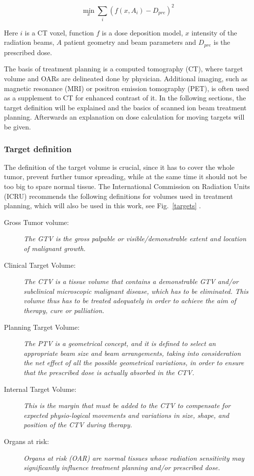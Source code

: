 \documentclass[type=dr, dr=rernat, accentcolor=tud7b,colorbacktitle, bigchapter, openright, twoside, 12pt ]{tudthesis}
\begin{document}
\begin{equation}
  \min_{x} \sum_{i} \left( f(x,A_i) - D_{pre} \right)^2 
\end{equation}

Here $i$ is a CT voxel, function $f$ is a dose deposition model, $x$ intensity of the radiation beams, $A$ patient geometry and beam parameters and $D_{pre}$ is the prescribed dose.

The basis of treatment planning is a computed tomography (CT), where target volume and OARs are delineated
done by physician. Additional imaging, such as magnetic resonance (MRI) or positron emission tomography (PET), is often used as a supplement to CT for enhanced contrast of it. In the following sections, the target definition will be explained and the basics of scanned ion beam treatment planning. Afterwards an explanation on dose calculation for moving targets will be given.

\subsubsection{Target definition}
The definition of the target volume is crucial, since it has to cover the whole tumor, prevent further tumor spreading, while at the same time it should not be too big to spare normal tissue. 
The International Commission on Radiation Units (ICRU) recommends the following definitions for volumes used in treatment planning, which will also be used in this work, see Fig.~\ref{targets} \cite{ICRU50, ICRU62}.
\begin{description}
\item[Gross Tumor volume:] \emph{The GTV is the gross
    palpable or visible/demonstrable extent and location of malignant
    growth.}
\item[Clinical Target Volume:] \emph{The CTV is a tissue
    volume that contains a demonstrable GTV and/or subclinical
    microscopic malignant disease, which has to be eliminated. This
    volume thus has to be treated adequately in order to achieve the
    aim of therapy, cure or palliation.}
\item[Planning Target Volume:] \emph{The PTV is a geometrical
    concept, and it is defined to select an appropriate beam size and
    beam arrangements, taking into consideration the net effect of all
    the possible geometrical variations, in order to ensure that the
    prescribed dose is actually absorbed in the CTV.}
\item[Internal Target Volume:] \emph{This is the margin that must be
    added to the CTV to compensate for expected physio-logical
    movements and variations in size, shape, and position of the
    CTV during therapy.}
\item[Organs at risk:] \emph{Organs at risk (OAR) are normal
    tissues whose radiation sensitivity may significantly influence
    treatment planning and/or prescribed dose.}
\end{description}
\end{document}
